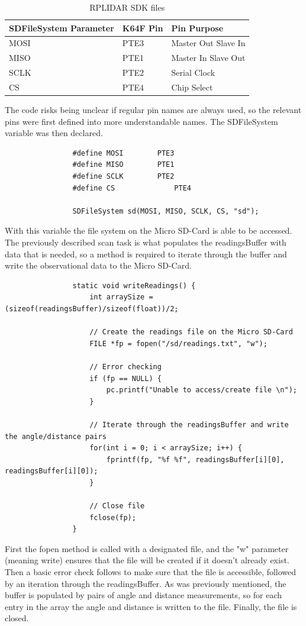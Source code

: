 				\begin{table}[h!]
					\centering
					\begin{tabular}{|| l | l | l ||} 
						\hline
						SDFileSystem Parameter & K64F Pin & Pin Purpose \\ [0.5ex] 
						\hline
						MOSI  & PTE3 & Master Out Slave In \\ 
						MISO  & PTE1  & Master In Slave Out \\
						SCLK  & PTE2 & Serial Clock \\
						CS & PTE4 & Chip Select \\ [1ex] 
						\hline
					\end{tabular}
					\caption{RPLIDAR SDK files}
					\label{table:sdfilesystempins}
				\end{table}
			
				The code risks being unclear if regular pin names are always used, so the relevant pins were first defined into more understandable names. The SDFileSystem variable was then declared.
				
				\begin{lstlisting}
				#define MOSI		PTE3
				#define MISO		PTE1
				#define	SCLK		PTE2
				#define	CS				PTE4
				
				SDFileSystem sd(MOSI, MISO, SCLK, CS, "sd");
				\end{lstlisting}
				
				With this variable the file system on the Micro SD-Card is able to be accessed. The previously described scan task is what populates the readingsBuffer with data that is needed, so a method is required to iterate through the buffer and write the observational data to the Micro SD-Card.
				
				\begin{lstlisting}
				static void writeReadings() {
					int arraySize = (sizeof(readingsBuffer)/sizeof(float))/2;
				
					// Create the readings file on the Micro SD-Card
					FILE *fp = fopen("/sd/readings.txt", "w");
				
					// Error checking
					if (fp == NULL) {
						pc.printf("Unable to access/create file \n");
					}
				
					// Iterate through the readingsBuffer and write the angle/distance pairs
					for(int i = 0; i < arraySize; i++) {
						fprintf(fp, "%f %f", readingsBuffer[i][0], readingsBuffer[i][0]);
					}
				
					// Close file
					fclose(fp);
				}
				\end{lstlisting}
				First the fopen method is called with a designated file, and the "w" parameter (meaning write) ensures that the file will be created if it doesn't already exist. Then a basic error check follows to make sure that the file is accessible, followed by an iteration through the readingsBuffer. As was previously mentioned, the buffer is populated by pairs of angle and distance measurements, so for each entry in the array the angle and distance is written to the file. Finally, the file is closed.
				
